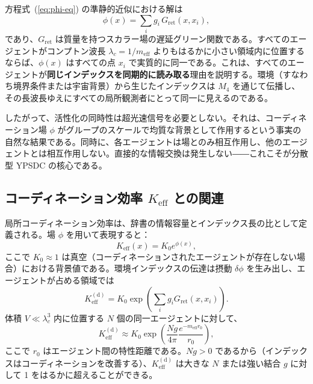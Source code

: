 \documentclass[11pt,a4paper]{article}
\newcommand{\Keff}{K_{\mathrm{eff}}}
\begin{document}
	方程式~(\ref{eq:phi-eq}) の準静的近似における解は
	\begin{equation}
		\phi(x) = \sum_i g_i \, G_{\mathrm{ret}}(x, x_i),
	\end{equation}
	であり、\(G_{\mathrm{ret}}\) は質量を持つスカラー場の遅延グリーン関数である。すべてのエージェントがコンプトン波長 \(\lambda_c = 1/m_{\mathrm{eff}}\) よりもはるかに小さい領域内に位置するならば、\(\phi(x)\) はすべての点 \(x_i\) で実質的に同一である。これは、すべてのエージェントが\textbf{同じインデックスを同期的に読み取る}理由を説明する。環境（すなわち境界条件または宇宙背景）から生じたインデックスは \(M_4\) を通じて伝播し、その長波長ゆえにすべての局所観測者にとって同一に見えるのである。
	
	したがって、活性化の同時性は超光速信号を必要としない。それは、コーディネーション場 \(\phi\) がグループのスケールで均質な背景として作用するという事実の自然な結果である。同時に、各エージェントは場とのみ相互作用し、他のエージェントとは相互作用しない。直接的な情報交換は発生しない――これこそが分散型 YPSDC の核心である。
	
	\subsection{コーディネーション効率 \(K_{\mathrm{eff}}\) との関連}
	
	局所コーディネーション効率は、辞書の情報容量とインデックス長の比として定義される。場 \(\phi\) を用いて表現すると：
	\begin{equation}
		\Keff(x) = K_0 e^{\phi(x)},
		\label{eq:Keff-field}
	\end{equation}
	ここで \(K_0 \approx 1\) は真空（コーディネーションされたエージェントが存在しない場合）における背景値である。環境インデックスの伝達は摂動 \(\delta\phi\) を生み出し、エージェントが占める領域では
	\begin{equation}
		\Keff^{\mathrm{(d)}} = K_0 \exp\!\left( \sum_i g_i G_{\mathrm{ret}}(x, x_i) \right).
	\end{equation}
	体積 \(V \ll \lambda_c^3\) 内に位置する \(N\) 個の同一エージェントに対して、
	\begin{equation}
		\Keff^{\mathrm{(d)}} \approx K_0 \exp\!\left( \frac{N g}{4\pi} \frac{e^{-m_{\mathrm{eff}} r_0}}{r_0} \right),
	\end{equation}
	ここで \(r_0\) はエージェント間の特性距離である。\(N g > 0\) であるから（インデックスはコーディネーションを改善する）、\(\Keff^{\mathrm{(d)}}\) は大きな \(N\) または強い結合 \(g\) に対して 1 をはるかに超えることができる。
	
\end{document}
